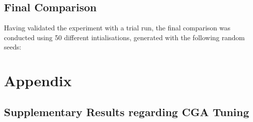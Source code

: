 \documentclass[10pt]{article}
\begin{document}
\begin{multicols}{2}
\subsection{Final Comparison}
Having validated the experiment with a trial run, the final comparison was conducted using 50 different intialisations, generated with the following random seeds:


\end{multicols}

\newpage
\section{Appendix}
\subsection{Supplementary Results regarding CGA Tuning}
\label{sec:CGA_tuning_results}
\end{document}

